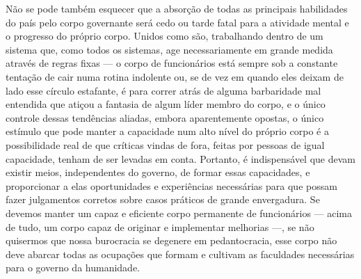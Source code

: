 Não se pode também esquecer que a absorção de todas as principais
habilidades do país pelo corpo governante será cedo ou tarde fatal para
a atividade mental e o progresso do próprio corpo. Unidos como
são, trabalhando dentro de um sistema que, como todos os sistemas, age
necessariamente em grande medida através de regras fixas --- o corpo de
funcionários está sempre sob a constante tentação de cair numa rotina
indolente ou, se de vez em quando eles deixam de lado esse círculo
estafante, é para correr atrás de alguma barbaridade mal entendida que
atiçou a fantasia de algum líder membro do corpo, e o único controle
dessas tendências aliadas, embora aparentemente opostas, o único
estímulo que pode manter a capacidade num alto nível do próprio corpo é
a possibilidade real de que críticas vindas de fora, feitas por pessoas
de igual capacidade, tenham de ser levadas em conta. Portanto, é
indispensável que devam existir meios, independentes do governo, de
formar essas capacidades, e proporcionar a elas oportunidades e
experiências necessárias para que possam fazer julgamentos corretos
sobre casos práticos de grande envergadura. Se devemos manter um capaz
e eficiente corpo permanente de funcionários --- acima de tudo, um corpo
capaz de originar e implementar melhorias ---, se não quisermos que nossa
burocracia se degenere em pedantocracia, esse corpo não deve abarcar
todas as ocupações que formam e cultivam as faculdades necessárias para
o governo da humanidade.

